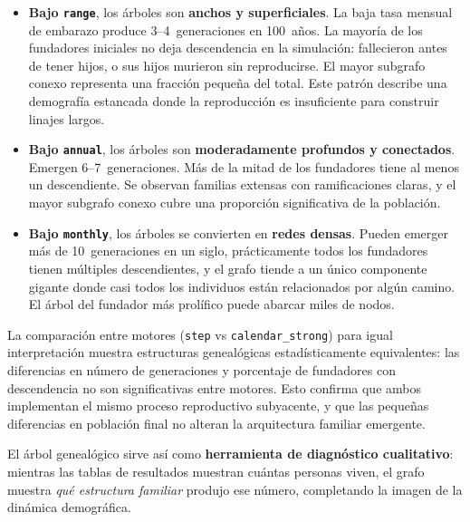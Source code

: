 \documentclass{llncs}
\begin{document}
\begin{itemize}
  \item \textbf{Bajo \texttt{range}}, los árboles son \textbf{anchos y
        superficiales}.
        La baja tasa mensual de embarazo produce 3--4~generaciones en
        100~años.
        La mayoría de los fundadores iniciales no deja descendencia en la
        simulación: fallecieron antes de tener hijos, o sus hijos murieron
        sin reproducirse.
        El mayor subgrafo conexo representa una fracción pequeña del total.
        Este patrón describe una demografía estancada donde la reproducción
        es insuficiente para construir linajes largos.

  \item \textbf{Bajo \texttt{annual}}, los árboles son
        \textbf{moderadamente profundos y conectados}.
        Emergen 6--7~generaciones.
        Más de la mitad de los fundadores tiene al menos un descendiente.
        Se observan familias extensas con ramificaciones claras, y el mayor
        subgrafo conexo cubre una proporción significativa de la población.

  \item \textbf{Bajo \texttt{monthly}}, los árboles se convierten en
        \textbf{redes densas}.
        Pueden emerger más de 10~generaciones en un siglo, prácticamente
        todos los fundadores tienen múltiples descendientes, y el grafo
        tiende a un único componente gigante donde casi todos los individuos
        están relacionados por algún camino.
        El árbol del fundador más prolífico puede abarcar miles de nodos.
\end{itemize}

La comparación entre motores (\texttt{step} vs \texttt{calendar\_strong})
para igual interpretación muestra estructuras genealógicas estadísticamente
equivalentes: las diferencias en número de generaciones y porcentaje de
fundadores con descendencia no son significativas entre motores.
Esto confirma que ambos implementan el mismo proceso reproductivo subyacente,
y que las pequeñas diferencias en población final no alteran la arquitectura
familiar emergente.

El árbol genealógico sirve así como \textbf{herramienta de diagnóstico
cualitativo}: mientras las tablas de resultados muestran cuántas personas
viven, el grafo muestra \emph{qué estructura familiar} produjo ese número,
completando la imagen de la dinámica demográfica.

\clearpage
\end{document}
